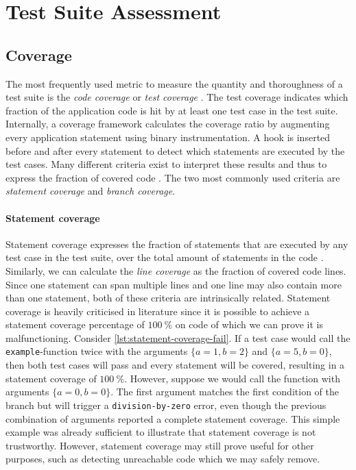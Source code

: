 
\section{Test Suite Assessment}

\subsection{Coverage}
The most frequently used metric to measure the quantity and thoroughness of a test suite is the \emph{code coverage} or \emph{test coverage} \cite[p.~467]{8016712}. The test coverage indicates which fraction of the application code is hit by at least one test case in the test suite. Internally, a coverage framework calculates the coverage ratio by augmenting every application statement using binary instrumentation. A hook is inserted before and after every statement to detect which statements are executed by the test cases. Many different criteria exist to interpret these results and thus to express the fraction of covered code \cite{Myers:2011:AST:2161638}. The two most commonly used criteria are \emph{statement coverage} and \emph{branch coverage}.

\paragraph*{Statement coverage} Statement coverage expresses the fraction of statements that are executed by any test case in the test suite, over the total amount of statements in the code \cite{6588537}. Similarly, we can calculate the \emph{line coverage} as the fraction of covered code lines. Since one statement can span multiple lines and one line may also contain more than one statement, both of these criteria are intrinsically related. Statement coverage is heavily criticised in literature \cite[p.~37]{Myers:2011:AST:2161638} since it is possible to achieve a statement coverage percentage of $\SI{100}{\percent}$ on code of which we can prove it is malfunctioning. Consider \cref{lst:statement-coverage-fail}. If a test case would call the \texttt{example}-function twice with the arguments $\{a = 1, b = 2\}$ and $\{a = 5, b = 0\}$, then both test cases will pass and every statement will be covered, resulting in a statement coverage of $\SI{100}{\percent}$. However, suppose we would call the function with arguments $\{a = 0, b = 0\}$. The first argument matches the first condition of the branch but will trigger a \texttt{division-by-zero} error, even though the previous combination of arguments reported a complete statement coverage. This simple example was already sufficient to illustrate that statement coverage is not trustworthy. However, statement coverage may still prove useful for other purposes, such as detecting unreachable code which we may safely remove.

